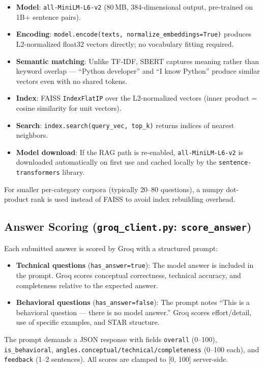 \documentclass[12pt,a4paper]{article}
\begin{document}
\begin{itemize}[leftmargin=1.5em]
  \item \textbf{Model}: \texttt{all-MiniLM-L6-v2} (80\,MB, 384-dimensional output, pre-trained on 1B+ sentence pairs).
  \item \textbf{Encoding}: \texttt{model.encode(texts, normalize\_embeddings=True)} produces L2-normalized float32 vectors directly; no vocabulary fitting required.
  \item \textbf{Semantic matching}: Unlike TF-IDF, SBERT captures meaning rather than keyword overlap --- ``Python developer'' and ``I know Python'' produce similar vectors even with no shared tokens.
  \item \textbf{Index}: FAISS \texttt{IndexFlatIP} over the L2-normalized vectors (inner product = cosine similarity for unit vectors).
  \item \textbf{Search}: \texttt{index.search(query\_vec, top\_k)} returns indices of nearest neighbors.
  \item \textbf{Model download}: If the RAG path is re-enabled, \texttt{all-MiniLM-L6-v2} is downloaded automatically on first use and cached locally by the \texttt{sentence-transformers} library.
\end{itemize}

For smaller per-category corpora (typically 20--80 questions), a numpy dot-product rank is used instead of FAISS to avoid index rebuilding overhead.

\subsection{Answer Scoring (\texttt{groq\_client.py}: \texttt{score\_answer})}

Each submitted answer is scored by Groq with a structured prompt:

\begin{itemize}[leftmargin=1.5em]
  \item \textbf{Technical questions} (\texttt{has\_answer=true}): The model answer is included in the prompt. Groq scores conceptual correctness, technical accuracy, and completeness relative to the expected answer.
  \item \textbf{Behavioral questions} (\texttt{has\_answer=false}): The prompt notes ``This is a behavioral question --- there is no model answer.'' Groq scores effort/detail, use of specific examples, and STAR structure.
\end{itemize}

The prompt demands a JSON response with fields \texttt{overall} (0--100), \texttt{is\_behavioral}, \texttt{angles.conceptual/technical/completeness} (0--100 each), and \texttt{feedback} (1--2 sentences). All scores are clamped to [0, 100] server-side.
\end{document}
